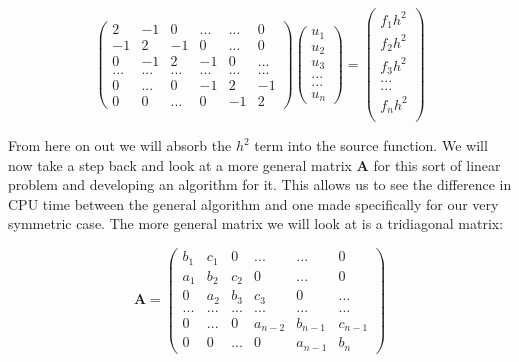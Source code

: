 \documentclass[a4paper,11pt]{article}
\begin{document}
{		\begin{equation}
			\begin{pmatrix}
				2 & -1 & 0 & ... & ... & 0 \\
				-1 & 2 & -1 & 0 & ... & 0 \\
				0 & -1 & 2 & -1 & 0 & ... \\
				... & ... & ... & ... & ... & ... \\
				0 & ... & 0 & -1 & 2 & -1 \\
				0 & 0 & ... & 0 & -1 & 2 
			\end{pmatrix} \begin{pmatrix}
			u_1\\
			u_2\\
			u_3\\
			...\\
			...\\
			u_n
		\end{pmatrix} = \begin{pmatrix}
		f_1 h^2 \\
		f_2 h^2 \\
		f_3 h^2 \\
		... \\
		... \\
		f_n h^2 \\
	\end{pmatrix}
\end{equation}

From here on out we will absorb the $h^2$ term into the source function. We will now take a step back and look at a more general matrix $\mathbf{A}$ for this sort of linear problem and developing an algorithm for it. This allows us to see the difference in CPU time between the general algorithm and one made specifically for our very symmetric case. The more general matrix we will look at is a tridiagonal matrix:

\begin{equation}
	\mathbf{A} = \begin{pmatrix}
		b_1 & c_1 & 0 & ... & ... & 0 \\
		a_1 & b_2 & c_2 & 0 & ... & 0 \\
		0 & a_2 & b_3 & c_3 & 0 & ... \\
		... & ... & ... & ... & ... & ... \\
		0 & ... & 0 & a_{n-2} & b_{n-1} & c_{n-1} \\
		0 & 0 & ... & 0 & a_{n-1} & b_{n} 
	\end{pmatrix}
	\label{general_tridiagonal_matrix}
\end{equation}

}
\end{document}
